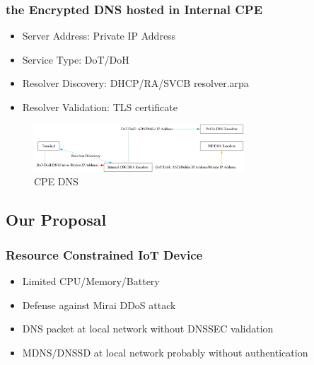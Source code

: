 \documentclass{ctexbeamer}
\begin{document}
\begin{frame}
    \frametitle{the Encrypted DNS hosted in Internal CPE}
           \begin{itemize}
               \item Server Address: Private IP Address
               \item Service Type: DoT/DoH
               \item Resolver Discovery: DHCP/RA/SVCB resolver.arpa
               \item Resolver Validation: TLS certificate
           \end{itemize}

    \begin{figure}[H]
        \centering 
        \includegraphics[width=0.7\textwidth]{pic/cpe_dns.png} 
        \caption{CPE DNS} 
        \label{fig.cpe_dns}
    \end{figure}

\end{frame}

\subsection{Our Proposal}

\begin{frame}
    \frametitle{Resource Constrained IoT Device}
           \begin{itemize}
               \item Limited CPU/Memory/Battery
               \item Defense against Mirai DDoS attack
               \item DNS packet at local network without DNSSEC validation
               \item MDNS/DNSSD at local network probably without authentication
           \end{itemize}
\end{frame}
\end{document}
